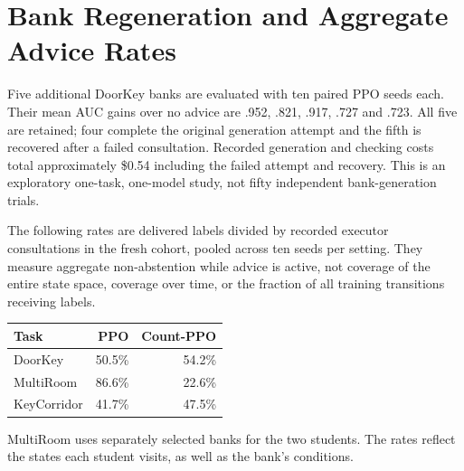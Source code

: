\section{Bank Regeneration and Aggregate Advice Rates}\label{sec:supp:bank_robustness}
Five additional DoorKey banks are evaluated with ten paired PPO seeds each.
Their mean AUC gains over no advice are .952, .821, .917, .727 and .723.
All five are retained; four complete the original generation attempt and
the fifth is recovered after a failed consultation. Recorded generation
and checking costs total approximately \$0.54 including the failed attempt
and recovery. This is an exploratory one-task, one-model study, not fifty
independent bank-generation trials.

The following rates are delivered labels divided by recorded executor
consultations in the fresh cohort, pooled across ten seeds per setting.
They measure aggregate non-abstention while advice is active, not coverage
of the entire state space, coverage over time, or the fraction of all
training transitions receiving labels.
\begin{center}\begin{tabular}{@{}lrr@{}}\toprule
Task & PPO & Count-PPO\\\midrule
DoorKey & 50.5\% & 54.2\%\\
MultiRoom & 86.6\% & 22.6\%\\
KeyCorridor & 41.7\% & 47.5\%\\\bottomrule
\end{tabular}\end{center}
MultiRoom uses separately selected banks for the two students. The rates
reflect the states each student visits, as well as the bank's conditions.
